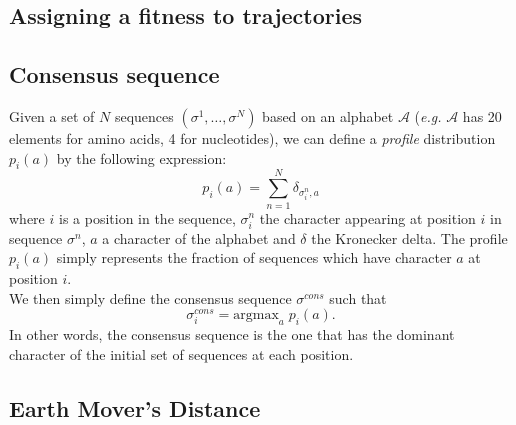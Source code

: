\documentclass[reprint,amsmath,amssymb,superscriptaddress,showpacs,rmp]{revtex4-1}
\begin{document}
\subsection*{Assigning a fitness to trajectories} %
\label{sub:assigning_a_fitness_to_trajectories}


\subsection*{Consensus sequence} %
\label{sub:consensus_sequence}
	Given a set of $N$ sequences $(\sigma^1,\ldots,\sigma^N)$ based on an alphabet $\mathcal{A}$ (\emph{e.g.} $\mathcal{A}$ has 20 elements for amino acids, 4 for nucleotides), we can define a \emph{profile} distribution $p_i(a)$ by the following expression:
	$$ p_i(a) = \sum_{n=1}^N \delta_{\sigma^n_i,a} $$ 
	where $i$ is a position in the sequence, $\sigma^n_i$ the character appearing at position $i$ in sequence $\sigma^n$, $a$ a character of the alphabet and $\delta$ the Kronecker delta. The profile $p_i(a)$ simply represents the fraction of sequences which have character $a$ at position $i$. \\
	We then simply define the consensus sequence $\sigma^{cons}$ such that 
	$$\sigma^{cons}_i = \text{argmax}_a \;p_i(a).$$
	In other words, the consensus sequence is the one that has the dominant character of the initial set of sequences at each position.   

\subsection*{Earth Mover's Distance} %
\label{sub:earth_mover_s_distance}
\end{document}

